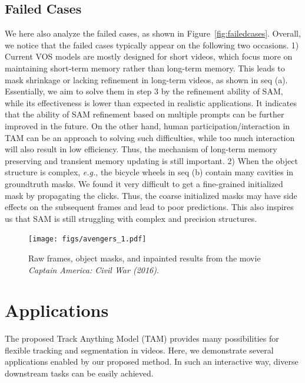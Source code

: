 \documentclass{article}
\begin{document}
\subsection{Failed Cases}
We here also analyze the failed cases, as shown in Figure~\ref{fig:failedcases}.
Overall, we notice that the failed cases typically appear on the following two occasions.
1)
Current VOS models are mostly designed for short videos, which focus more on maintaining short-term memory rather than long-term memory.
This leads to mask shrinkage or lacking refinement in long-term videos, as shown in seq (a).
Essentially, we aim to solve them in step 3 by the refinement ability of SAM, while its effectiveness is lower than expected in realistic applications.
It indicates that the ability of SAM refinement based on multiple prompts can be further improved in the future.
On the other hand, human participation/interaction in TAM can be an approach to solving such difficulties, while too much interaction will also result in low efficiency.
Thus, the mechanism of long-term memory preserving and transient memory updating is still important.
2) When the object structure is complex, \textit{e.g.}, the bicycle wheels in seq (b) contain many cavities in groundtruth masks. We found it very difficult to get a fine-grained initialized mask by propagating the clicks.
Thus, the coarse initialized masks may have side effects on the subsequent frames and lead to poor predictions.
This also inspires us that SAM is still struggling with complex and precision structures.


\begin{figure}[t]
\centering
\texttt{[image: figs/avengers\_1.pdf]}
\caption{Raw frames, object masks, and inpainted results from the movie \textit{Captain America: Civil War (2016)}.}
\label{fig:captain}
\end{figure}



\section{Applications}
The proposed Track Anything Model (TAM) provides many possibilities for flexible tracking and segmentation in videos.
Here, we demonstrate several applications enabled by our proposed method.
In such an interactive way, diverse downstream tasks can be easily achieved.
\end{document}
